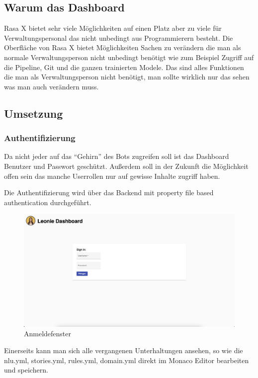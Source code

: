 \subsection{Warum das Dashboard}
Rasa X bietet sehr viele Möglichkeiten auf einen Platz aber zu viele für Verwaltungspersonal das nicht unbedingt aus Programmierern besteht.
Die Oberfläche von Rasa X bietet Möglichkeiten Sachen zu verändern die man als normale Verwaltungsperson nicht unbedingt benötigt wie zum Beispiel Zugriff auf die Pipeline, Git und die ganzen trainierten Modele.
Das sind alles Funktionen die man als Verwaltungsperson nicht benötigt, man sollte wirklich nur das sehen was man auch verändern muss.

\subsection{Umsetzung}

\subsubsection{Authentifizierung}
Da nicht jeder auf das ``Gehirn'' des Bots zugreifen soll ist das Dashboard Benutzer und Passwort geschützt.
Außerdem soll in der Zukunft die Möglichkeit offen sein das manche Userrollen nur auf gewisse Inhalte zugriff haben.

Die Authentifizierung wird über das Backend mit property file based authentication\cite{authentication} durchgeführt.

\begin{figure}[hbt!]
    \centering
    \includegraphics[scale=0.2]{pics/signin}
    \caption{Anmeldefenster}
    \label{fig:impl:signin}
\end{figure}

Einerseits kann man sich alle vergangenen Unterhaltungen ansehen, so wie die nlu.yml, stories.yml, rules.yml, domain.yml direkt im Monaco Editor bearbeiten und speichern.

